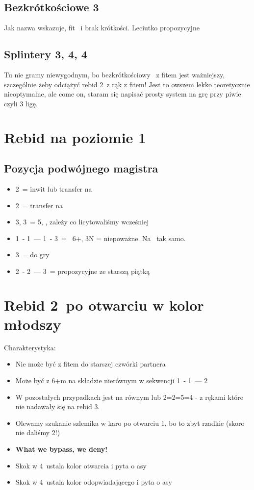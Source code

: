 \documentclass[12pt, a4paper]{article}
\begin{document}
\subsection*{Bezkrótkościowe 3\ntx}
Jak nazwa wskazuje, fit \hearts\ i brak krótkości. Leciutko propozycyjne

\subsection*{Splintery 3\spades, 4\clubs, 4\diams}
Tu nie gramy niewygodnym, bo bezkrótkościowy \gf\ z fitem jest ważniejszy, szczególnie żeby odciążyć rebid 2\nt\ z rąk z fitem!
Jest to owszem lekko teoretycznie nieoptymalne, ale come on, staram się napisać prosty system na grę przy piwie czyli 3 ligę.



\pagebreak
\section{Rebid na poziomie 1}
\subsection*{Pozycja podwójnego magistra}
\begin{itemize}
    \item 2\clubs\ = inwit lub transfer na \diams\
    \item 2\nt\ = transfer na \clubs\
    \item 3\clubs, 3\diams\ = 5\major, \gf, zależy co licytowaliśmy wcześniej
    \item 1\clubs\ - 1\spades\ --- 1\nt\ - 3\spades\ = \gf\ 6+\spades, 3N = niepoważne. Na \hearts\ tak samo.
    \item 3\nt\ = do gry
    \item 2\clubs\ - 2\diams\ --- 3\nt\ = propozycyjne ze starszą piątką
\end{itemize}



\pagebreak
\section{Rebid 2\ntx\ po otwarciu w kolor młodszy}
Charakterystyka:
\begin{itemize}
    \item Nie może być z fitem do starszej czwórki partnera
    \item Może być z 6+m na składzie nierównym w sekwencji 1\diams\ - 1\hearts\ --- 2\nt
    \item W pozostałych przypadkach jest na równym lub 2=2=5=4 - z rękami które nie nadawały się na rebid 3\clubs.
    \item Olewamy szukanie szlemika w karo po otwarciu 1\clubs, bo to zbyt rzadkie (skoro nie daliśmy 2\diams!)
    \item \textbf{What we bypass, we deny!}
    \item Skok w 4\clubs\ ustala kolor otwarcia i pyta o asy
    \item Skok w 4\diams\ ustala kolor odopwiadającego i pyta o asy
\end{itemize}
\end{document}
